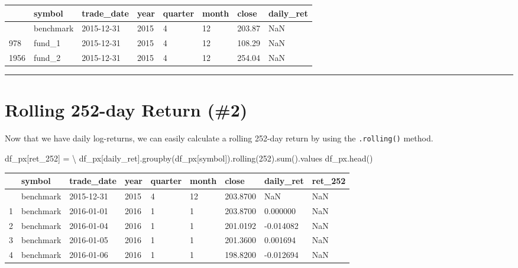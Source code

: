 \documentclass[
  letterpaper,
  DIV=11,
  numbers=noendperiod]{scrreprt}
\newenvironment{Shaded}{\begin{snugshade}}{\end{snugshade}}
\newcommand{\BuiltInTok}[1]{\textcolor[rgb]{0.00,0.23,0.31}{#1}}
\newcommand{\DecValTok}[1]{\textcolor[rgb]{0.68,0.00,0.00}{#1}}
\newcommand{\NormalTok}[1]{\textcolor[rgb]{0.00,0.23,0.31}{#1}}
\newcommand{\OperatorTok}[1]{\textcolor[rgb]{0.37,0.37,0.37}{#1}}
\newcommand{\StringTok}[1]{\textcolor[rgb]{0.13,0.47,0.30}{#1}}
\begin{document}
\begin{longtable}[]{@{}llllllll@{}}
\toprule\noalign{}
& symbol & trade\_date & year & quarter & month & close & daily\_ret \\
\midrule\noalign{}
\endhead
\bottomrule\noalign{}
\endlastfoot
0 & benchmark & 2015-12-31 & 2015 & 4 & 12 & 203.87 & NaN \\
978 & fund\_1 & 2015-12-31 & 2015 & 4 & 12 & 108.29 & NaN \\
1956 & fund\_2 & 2015-12-31 & 2015 & 4 & 12 & 254.04 & NaN \\
\end{longtable}

\begin{center}\rule{0.5\linewidth}{0.5pt}\end{center}

\hypertarget{rolling-252-day-return-2}{%
\section{Rolling 252-day Return (\#2)}\label{rolling-252-day-return-2}}

Now that we have daily log-returns, we can easily calculate a rolling
252-day return by using the \texttt{.rolling()} method.

\begin{Shaded}
\begin{Highlighting}[]
\NormalTok{df\_px[}\StringTok{\textquotesingle{}ret\_252\textquotesingle{}}\NormalTok{] }\OperatorTok{=} \OperatorTok{\textbackslash{}}
\NormalTok{    df\_px[}\StringTok{\textquotesingle{}daily\_ret\textquotesingle{}}\NormalTok{].groupby(df\_px[}\StringTok{\textquotesingle{}symbol\textquotesingle{}}\NormalTok{]).rolling(}\DecValTok{252}\NormalTok{).}\BuiltInTok{sum}\NormalTok{().values}
\NormalTok{df\_px.head()}
\end{Highlighting}
\end{Shaded}

\begin{longtable}[]{@{}lllllllll@{}}
\toprule\noalign{}
& symbol & trade\_date & year & quarter & month & close & daily\_ret &
ret\_252 \\
\midrule\noalign{}
\endhead
\bottomrule\noalign{}
\endlastfoot
0 & benchmark & 2015-12-31 & 2015 & 4 & 12 & 203.8700 & NaN & NaN \\
1 & benchmark & 2016-01-01 & 2016 & 1 & 1 & 203.8700 & 0.000000 & NaN \\
2 & benchmark & 2016-01-04 & 2016 & 1 & 1 & 201.0192 & -0.014082 &
NaN \\
3 & benchmark & 2016-01-05 & 2016 & 1 & 1 & 201.3600 & 0.001694 & NaN \\
4 & benchmark & 2016-01-06 & 2016 & 1 & 1 & 198.8200 & -0.012694 &
NaN \\
\end{longtable}
\end{document}

